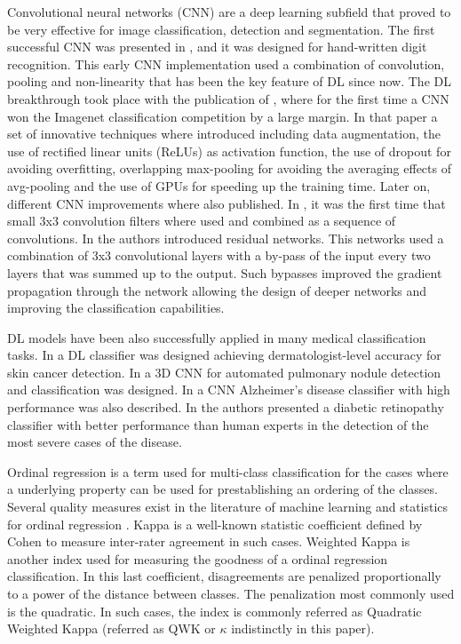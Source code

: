 \documentclass[review]{elsarticle}
\theoremstyle{definition} %
\theoremstyle{remark}
\begin{document}
Convolutional neural networks (CNN) are a deep learning subfield that proved to be very effective for image classification, detection and segmentation. The first successful CNN was presented in \cite{LeCun:98}, and it was designed for hand-written digit recognition. This early CNN implementation used a combination of convolution, pooling and non-linearity that has been the key feature of DL since now. The DL breakthrough took place with the publication of \cite{NIPS2012_4824}, where for the first time a CNN won the Imagenet\cite{imagenet_cvpr09} classification competition by a large margin. In that paper a set of innovative techniques where introduced including data augmentation, the use of rectified linear units (ReLUs) as activation function, the use of dropout for avoiding overfitting, overlapping max-pooling for avoiding the averaging effects of avg-pooling and the use of GPUs for speeding up the training time. Later on, different CNN improvements where also published. In \cite{vggnet}, it was the first time that small 3x3 convolution filters where used and combined as a sequence of convolutions. In \cite{he2016deep} the authors introduced residual networks. This networks used a combination of 3x3 convolutional layers with a by-pass of the input every two layers that was summed up to the output. Such bypasses improved the gradient propagation through the network allowing the design of deeper networks and improving the classification capabilities. 

DL models have been also successfully applied in many medical classification tasks. In \cite{esteva2017dermatologist} a DL classifier was designed achieving dermatologist-level accuracy for skin cancer detection. In \cite{wentao2018deeplung} a 3D CNN for automated pulmonary nodule detection and classification was designed. In \cite{wang2018classification} a CNN Alzheimer's disease classifier with high performance was also described. In \cite{doi:10.1001/jama.2016.17216} the authors presented a diabetic retinopathy classifier with better performance than human experts in the detection of the most severe cases of the disease.

Ordinal regression is a term used for multi-class classification for the cases where a underlying property can be used for prestablishing an ordering of the classes. Several quality measures exist in the literature of machine learning and statistics for ordinal regression \citep{mehdiyev2016evaluating}. Kappa is a well-known statistic coefficient defined by Cohen \citep{cohen1960coefficient} to measure inter-rater agreement in such cases. Weighted Kappa \citep{cohen1968weighted} is another index used for measuring the goodness of a ordinal regression classification. In this last coefficient, disagreements are penalized proportionally to a power of the distance between classes. The penalization most commonly used is the quadratic. In such cases, the index is commonly referred as Quadratic Weighted Kappa (referred as QWK or $\kappa$ indistinctly in this paper).
\end{document}
